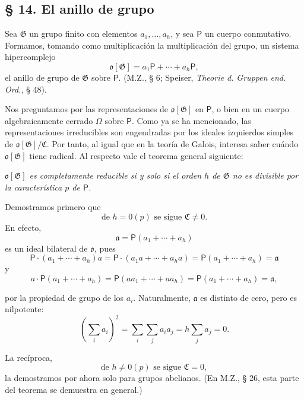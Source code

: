 
\subsection*{§ 14. El anillo de grupo}\label{el-anillo-de-grupo}

Sea \(\mathfrak G\) un grupo finito con elementos \(a_1,\ldots,a_h\), y sea \(\mathsf P\) un cuerpo conmutativo. Formamos, tomando como multiplicación la multiplicación del grupo, un sistema hipercomplejo
\[
\mathfrak o[\mathfrak G]=a_1\mathsf P+\cdots+a_h\mathsf P,
\]
el anillo de grupo de \(\mathfrak G\) sobre \(\mathsf P\). (M.Z., § 6; Speiser, \emph{Theorie d. Gruppen end. Ord.}, § 48).

Nos preguntamos por las representaciones de \(\mathfrak o[\mathfrak G]\) en \(\mathsf P\), o bien en un cuerpo algebraicamente cerrado \(\Omega\) sobre \(\mathsf P\). Como ya se ha mencionado, las representaciones irreducibles son engendradas por los ideales izquierdos simples de \(\mathfrak o[\mathfrak G]/\mathfrak C\). Por tanto, al igual que en la teoría de Galois, interesa saber cuándo \(\mathfrak o[\mathfrak G]\) tiene radical. Al respecto vale el teorema general siguiente:

\begin{center}
\emph{\(\mathfrak o[\mathfrak G]\) es completamente reducible si y solo si el orden \(h\) de \(\mathfrak G\) no es divisible por la característica \(p\) de \(\mathsf P\).}
\end{center}

Demostramos primero que
\[
\text{de } h=0(p) \text{ se sigue } \mathfrak C\ne 0.
\]
En efecto,
\[
\mathfrak a=\mathsf P(a_1+\cdots+a_h)
\]
es un ideal bilateral de \(\mathfrak o\), pues
\[
\mathsf P\cdot(a_1+\cdots+a_h)a
=\mathsf P\cdot(a_1a+\cdots+a_ha)
=\mathsf P(a_1+\cdots+a_h)=\mathfrak a
\]
y
\[
a\cdot\mathsf P(a_1+\cdots+a_h)
=\mathsf P(aa_1+\cdots+aa_h)
=\mathsf P(a_1+\cdots+a_h)=\mathfrak a,
\]

por la propiedad de grupo de los \(a_i\). Naturalmente, \(\mathfrak a\) es distinto de cero, pero es nilpotente:
\[
\left(\sum_i a_i\right)^2=\sum_i\sum_j a_i a_j
=h\sum_j a_j=0.
\]

La recíproca,
\[
\text{de } h\ne0(p) \text{ se sigue } \mathfrak C=0,
\]
la demostramos por ahora solo para grupos abelianos. (En M.Z., § 26, esta parte del teorema se demuestra en general.)

